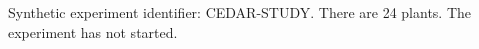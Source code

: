 \documentclass{article}
\begin{document}
Synthetic experiment identifier: CEDAR-STUDY.
There are 24 plants. The experiment has not started.
\end{document}
